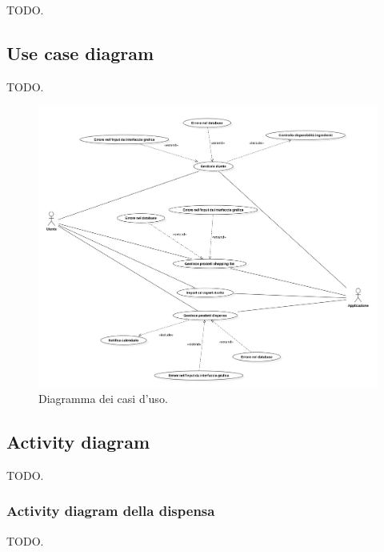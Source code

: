\documentclass{article}
\begin{document}
TODO.

\subsection{Use case diagram}

TODO.

\begin{figure}[h!]
    \includegraphics[width=\linewidth]{images/use-case.png}
    \caption{Diagramma dei casi d'uso.}
    \label{fig:usecase}
\end{figure}

\subsection{Activity diagram}

TODO.

\subsubsection{Activity diagram della dispensa}

TODO.
\end{document}
